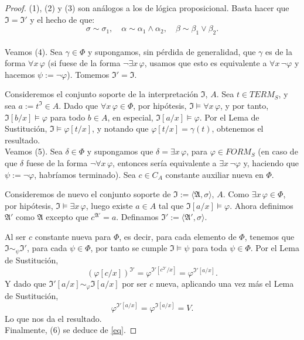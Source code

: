 \begin{proof} \mbox{}

(1), (2) y (3) son análogos a los de lógica proposicional. Basta hacer que $\mathfrak{I} = \mathfrak{I}'$ y el hecho de que:$$\sigma \sim \sigma_1, \quad \alpha \sim \alpha_1 \land \alpha_2, \quad \beta \sim \beta_1 \lor \beta_2.$$ \\

Veamos (4). Sea $\gamma \in \Phi$ y supongamos, sin pérdida de generalidad, que $\gamma$ es de la forma $\forall x \, \varphi$ (si fuese de la forma $\neg \exists x \, \varphi$, usamos que esto es equivalente a $\forall x \, \neg \varphi$ y hacemos $\psi := \neg \varphi$). Tomemos $\mathfrak{I}' = \mathfrak{I}$.

\noindent Consideremos el conjunto soporte de la interpretación $\mathfrak{I}$, $A$. Sea $t \in TERM_S$, y sea $a := t^{\mathfrak{I}} \in A$. Dado que $\forall x \, \varphi \in \Phi$, por hipótesis, $\mathfrak{I} \vDash \forall x \, \varphi$, y por tanto, $\mathfrak{I}[b/x] \vDash \varphi$ para todo $b \in A$, en especial, $\mathfrak{I}[a/x] \vDash \varphi$. Por el Lema de Sustitución, $\mathfrak{I} \vDash \varphi[t/x]$, y notando que $\varphi[t/x] = \gamma(t)$, obtenemos el resultado. \\

Veamos (5). Sea $\delta \in \Phi$ y supongamos que $\delta = \exists x \, \varphi$, para $\varphi \in FORM_S$ (en caso de que $\delta$ fuese de la forma $\neg \forall x \, \varphi$, entonces sería equivalente a $\exists x \, \neg \varphi$ y, haciendo que $\psi := \neg \varphi$, habríamos terminado). Sea $c \in C_A$ constante auxiliar nueva en $\Phi$.

\noindent Consideremos de nuevo el conjunto soporte de $\mathfrak{I} := \langle \mathfrak{A}, \sigma \rangle$, $A$. Como $\exists x \, \varphi \in \Phi$, por hipótesis, $\mathfrak{I} \vDash \exists x \, \varphi$, luego existe $a \in A$ tal que $\mathfrak{I}[a/x] \vDash \varphi$. Ahora definimos $\mathfrak{A}'$ como $\mathfrak{A}$ excepto que $c^{\mathfrak{A}'} = a$. Definamos $\mathfrak{I}' := \langle \mathfrak{A}', \sigma \rangle$. 

\noindent Al ser $c$ constante nueva para $\Phi$, es decir, para cada elemento de $\Phi$, tenemos que $\mathfrak{I} \sim_{\psi} \mathfrak{I}'$, para cada $\psi \in \Phi$, por tanto se cumple $\mathfrak{I} \vDash \psi$ para toda $\psi\in\Phi$. Por el Lema de Sustitución, 
$$(\varphi[c/x])^{\mathfrak{I}'} = \varphi^{\mathfrak{I}'[c^{\mathfrak{I}'}/x]} = \varphi^{\mathfrak{I}'[a/x]}.$$
Y dado que $\mathfrak{I}'[a/x] \sim_{\varphi} \mathfrak{I}[a/x]$ por ser $c$ nueva, aplicando una vez más el Lema de Sustitución, 
$$\varphi^{\mathfrak{I}'[a/x]} = \varphi^{\mathfrak{I}[a/x]} = V.$$
Lo que nos da el resultado. \\

Finalmente, (6) se deduce de \ref{eq}. 
\end{proof}

